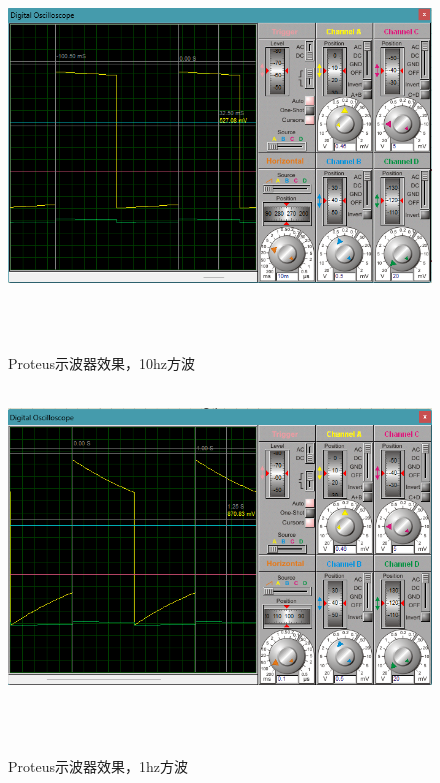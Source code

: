 \documentclass[12pt,hyperref,a4paper,UTF8]{ctexart}
\begin{document}
\begin{figure}[H] %
    \centering
    \includegraphics[width=1\textwidth]{figures/203.png} %
    \caption{Proteus示波器效果，10hz方波 } %
    \label{fig:example} %
\end{figure}


\begin{figure}[H] %
        \centering
        \includegraphics[width=1\textwidth]{figures/204.png} %
        \caption{Proteus示波器效果，1hz方波 } %
        \label{fig:example} %
\end{figure}
\end{document}
